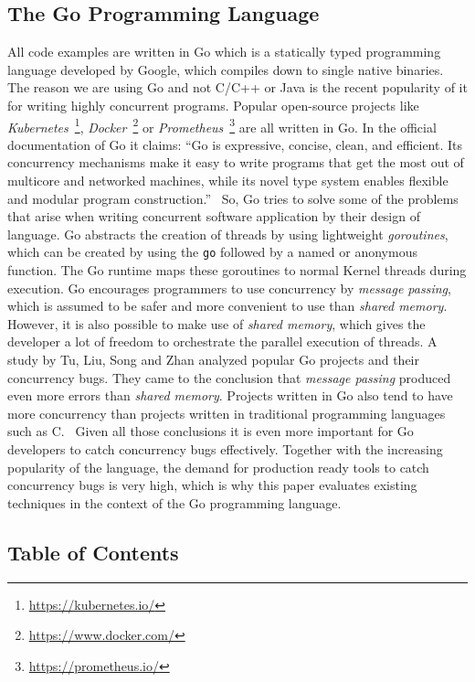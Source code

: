 \documentclass[conference]{IEEEtran}
\begin{document}
\subsection{The Go Programming Language}
All code examples are written in Go which is a statically typed programming language developed by Google, which compiles down to single native binaries.
The reason we are using Go and not C/C++ or Java is the recent popularity of it for writing highly concurrent programs.
Popular open-source projects like \emph{Kubernetes}~\footnote{\url{https://kubernetes.io/}}, \emph{Docker}~\footnote{\url{https://www.docker.com/}} or \emph{Prometheus}~\footnote{\url{https://prometheus.io/}} are all written in Go.
In the official documentation of Go it claims: ``Go is expressive, concise, clean, and efficient. Its concurrency mechanisms make it easy to write programs that get the most out of multicore and networked machines, while its novel type system enables flexible and modular program construction.''~\cite{goDocs}
So, Go tries to solve some of the problems that arise when writing concurrent software application by their design of language.
Go abstracts the creation of threads by using lightweight \emph{goroutines}, which can be created by using the \lstinline{go} followed by a named or anonymous function.
The Go runtime maps these goroutines to normal Kernel threads during execution.
Go encourages programmers to use concurrency by \emph{message passing}, which is assumed to be safer and more convenient to use than \emph{shared memory}.
However, it is also possible to make use of \emph{shared memory}, which gives the developer a lot of freedom to orchestrate the parallel execution of threads.
A study by Tu, Liu, Song and Zhan analyzed popular Go projects and their concurrency bugs.
They came to the conclusion that \emph{message passing} produced even more errors than \emph{shared memory}.
Projects written in Go also tend to have more concurrency than projects written in traditional programming languages such as C.~\cite{tu2019go}
Given all those conclusions it is even more important for Go developers to catch concurrency bugs effectively.
Together with the increasing popularity of the language, the demand for production ready tools to catch concurrency bugs is very high, which is why this paper evaluates existing techniques in the context of the Go programming language.

\subsection{Table of Contents}
\end{document}
